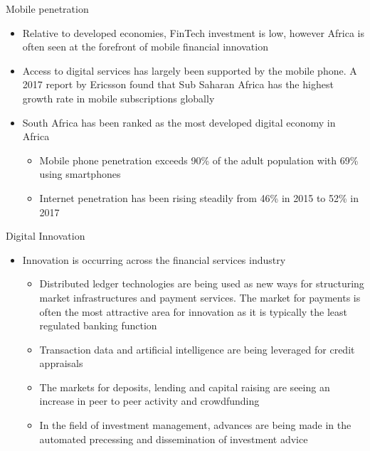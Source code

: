 \documentclass[11pt]{beamer}
\begin{document}
\begin{frame}{Mobile penetration}
	\begin{itemize}
		\item Relative to developed economies, FinTech investment is low, however Africa is often seen at the forefront of mobile financial innovation
		\item Access to digital services has largely been supported by the mobile phone. A 2017 report by Ericsson found that Sub Saharan Africa has the highest growth rate in mobile subscriptions globally
		\item South Africa has been ranked as the most developed digital economy in Africa
		\begin{itemize}
			\item Mobile phone penetration exceeds 90\% of the adult population with 69\% using smartphones
			\item Internet penetration has been rising steadily from 46\% in 2015 to 52\% in 2017
		\end{itemize}
	\end{itemize}
\end{frame}


\begin{frame}{Digital Innovation}
	\begin{itemize}
		\item Innovation is occurring across the financial services industry
		\begin{itemize}
			\item Distributed ledger technologies are being used as new ways for structuring market infrastructures and payment services. The market for payments is often the most attractive area for innovation as it is typically the least regulated banking function
			\item Transaction data and artificial intelligence are being leveraged for credit appraisals
			\item The markets for deposits, lending and capital raising are seeing an increase in peer to peer activity and crowdfunding
			\item In the field of investment management, advances are being made in the automated precessing and dissemination of investment advice
		\end{itemize}
	\end{itemize}
\end{frame}
\end{document}
